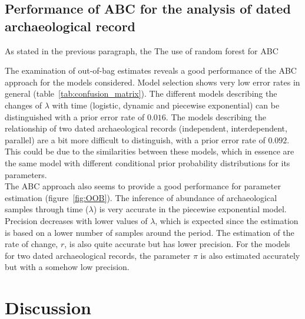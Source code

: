 \documentclass[a4paper]{article}
\begin{document}



\subsection*{Performance of ABC for the analysis of dated archaeological record}

As stated in the previous paragraph, the The use of random forest for ABC

The examination of out-of-bag estimates reveals a good performance of the ABC approach for the models considered. Model selection shows very low error rates in general (table~\ref{tab:confusion_matrix}). The different models describing the changes of $\lambda$ with time (logistic, dynamic and piecewise exponential) can be distinguished with a prior error rate of $0.016$. The models describing the relationship of two dated archaeological records (independent, interdependent, parallel) are a bit more difficult to distinguish, with a prior error rate of $0.092$. This could be due to the similarities between these models, which in essence are the same model with different conditional prior probability distributions for its parameters.
\\

The ABC approach also seems to provide a good performance for parameter estimation (figure~\ref{fig:OOB}). The inference of abundance of archaeological samples through time ($\lambda$) is very accurate in the piecewise exponential model. Precision decreases with lower values of $\lambda$, which is expected since the estimation is based on a lower number of samples around the period. The estimation of the rate of change, $r$, is also quite accurate but has lower precision. For the models for two dated archaeological records, the parameter $\pi$ is also estimated accurately but with a somehow low precision.
\\



\section*{\centering Discussion}
\end{document}
